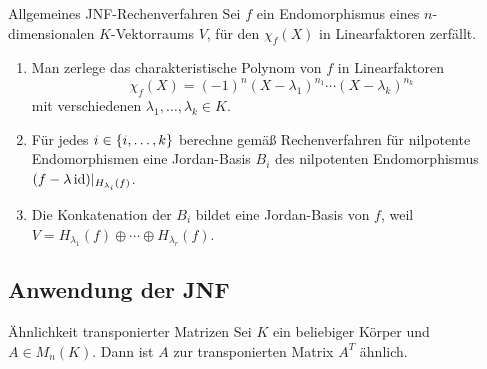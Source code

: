 \documentclass[main.tex]{subfiles}
\begin{document}
\begin{karte}{Allgemeines JNF-Rechenverfahren}
    Sei \(f\) ein Endomorphismus eines \(n\)-dimensionalen \(K\)-Vektorraums \(V\),
    für den \(\chi_f(X)\) in Linearfaktoren zerfällt.
    \begin{enumerate}
        \item Man zerlege das charakteristische Polynom von \(f\) in
        Linearfaktoren
        \[ \chi_f(X) = (-1)^n (X-\lambda_1)^{n_1}\cdots (X-\lambda_k)^{n_k} \]
        mit verschiedenen \(\lambda_1, \ldots, \lambda_k \in K\).
        \item Für jedes \(i \in \{i,\ldots,k\}\) berechne gemäß Rechenverfahren
        für nilpotente Endomorphismen eine Jordan-Basis \(B_i\) des nilpotenten 
        Endomorphismus \( (f-\lambda \operatorname{id})\vert_{H_{\lambda_i}(f)} \).
        \item Die Konkatenation der \(B_i\) bildet eine Jordan-Basis von \(f\),
        weil \\
        \(V = H_{\lambda_1}(f) \oplus \cdots \oplus H_{\lambda_r}(f)\).
    \end{enumerate}
\end{karte}

\subsection*{Anwendung der JNF}

\begin{karte}{Ähnlichkeit transponierter Matrizen}
    Sei \(K\) ein beliebiger Körper und \(A \in M_n(K)\). Dann ist 
    \(A\) zur transponierten Matrix \(A^T\) ähnlich.
\end{karte}
\end{document}
